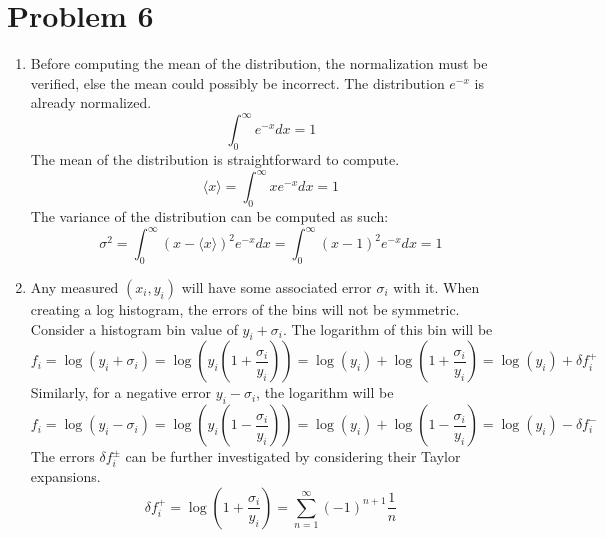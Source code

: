 \documentclass[11pt,letterpaper]{article}
\begin{document}
\section*{Problem 6}

\begin{enumerate}
\item Before computing the mean of the distribution, the normalization must be
    verified, else the mean could possibly be incorrect. The distribution
    $e^{-x}$ is already normalized.
    \begin{displaymath}
        \int_0^\infty e^{-x}dx = 1
    \end{displaymath}
    The mean of the distribution is straightforward to compute.
    \begin{displaymath}
        \langle x \rangle = \int_0^\infty x e^{-x} dx = 1
    \end{displaymath}
    The variance of the distribution can be computed as such:
    \begin{displaymath}
        \sigma^2 = \int_0^\infty \left(x - \langle x \rangle\right)^2 e^{-x} dx
        = \int_0^\infty \left(x - 1\right)^2 e^{-x} dx = 1
    \end{displaymath}
\item Any measured $\left(x_i, y_i\right)$ will have some associated error
    $\sigma_i$ with it. When creating a log histogram, the errors of the bins
    will not be symmetric. Consider a histogram bin value of $y_i + \sigma_i$.
    The logarithm of this bin will be
    \begin{displaymath}
        f_i = \log\left(y_i + \sigma_i\right) = \log\left(y_i\left(1 +
        \frac{\sigma_i}{y_i}\right)\right) = \log\left(y_i\right) +
        \log\left(1 + \frac{\sigma_i}{y_i}\right) = \log\left(y_i\right) +
        \delta f_i^+
    \end{displaymath}
    Similarly, for a negative error $y_i - \sigma_i$, the logarithm will be
    \begin{displaymath}
        f_i = \log\left(y_i - \sigma_i\right) = \log\left(y_i\left(1 -
        \frac{\sigma_i}{y_i}\right)\right) = \log\left(y_i\right) +
        \log\left(1 - \frac{\sigma_i}{y_i}\right) = \log\left(y_i\right) -
        \delta f_i^-
    \end{displaymath}
    The errors $\delta f_i^\pm$ can be further investigated by considering their
    Taylor expansions.
    \begin{equation}
        \delta f_i^+ = \log\left(1 + \frac{\sigma_i}{y_i}\right) =
        \sum_{n=1}^\infty \left(-1\right)^{n+1} \frac{1}{n}

\end{equation}
\end{enumerate}
\end{document}

